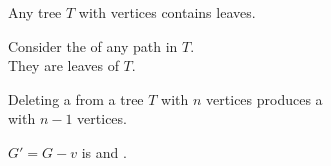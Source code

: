 \begin{frame}{}
  \begin{lemma}
    Any tree $T$ with  vertices contains  leaves.
  \end{lemma}


  \pause
  \vspace{0.50cm}
  \begin{center}
    Consider the  of any  path in $T$.
    \pause \\[10pt]
    They are leaves of $T$.
  \end{center}
\end{frame}

\begin{frame}{}
  \begin{lemma}
    Deleting a  from a tree $T$ with $n$ vertices
    produces a  \\ with $n-1$ vertices.
  \end{lemma}

  \pause
  \vspace{0.30cm}
  \begin{center}

    \vspace{0.20cm}
    $G' = G - v$ is  and .

    \pause
    \vspace{0.50cm}

    \pause
    \vspace{0.80cm}
  \end{center}
\end{frame}


